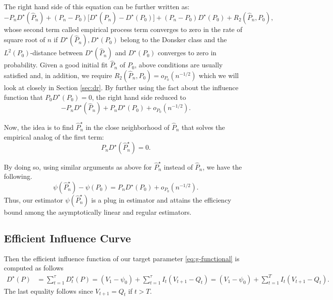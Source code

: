 \documentclass{article}
\theoremstyle{plain}
\theoremstyle{definition}
\theoremstyle{remark}
\begin{document}
The right hand side of this equation can be further written as:
\begin{equation}
    -P_nD^\star(\hat{P}_n) + (P_n-P_0)\big[D^\star(\hat{P}_n) -D^\star(P_0)\big]  + (P_n-P_0)D^\star(P_0)+ R_2(\hat{P}_n,P_0),
\end{equation}
whose second term called empirical process term converges to zero in the rate of square root of $n$ if $D^\star(\hat{P}_n), D^\star(P_0)$ belong to the Donsker class and the $L^2(P_0)$-distance between $D^\star(\hat{P}_n)$ and $D^\star(P_0)$ converges to zero in probability. Given a good initial fit $\hat{P}_n$ of $P_0$, above conditions are usually satisfied and, in addition, we require $R_2(\hat{P}_n,P_0)=o_{P_0}(n^{-1/2})$ which we will look at closely in Section \ref{sec:dr}. By further using the fact about the influence function that $P_0D^\star(P_0)=0$, the right hand side reduced to
\begin{equation}
    -P_nD^\star(\hat{P}_n) + P_nD^\star(P_0)+ o_{P_0}(n^{-1/2}).
\end{equation}

Now, the idea is to find $\hat{P}_n^\star$ in the close neighborhood of $\hat{P}_n$ that solves the empirical analog of the first term:
\begin{equation}
    \label{eq:eee}
    P_nD^\star(\hat{P}_n^\star) = 0.
\end{equation}

By doing so, using similar arguments as above for $\hat{P}_n^\star$ instead of $\hat{P}_n$, we have the following.
\begin{equation}
    \psi(\hat{P}_n^\star) - \psi(P_0) = P_nD^\star(P_0) + o_{P_0}(n^{-1/2}).
\end{equation}
Thus, our estimator $\psi(\hat{P}_n^\star)$ is a plug in estimator and attains the efficiency bound among the asymptotically linear and regular estimators.

\subsection{Efficient Influence Curve}

Then the efficient influence function of our target parameter \eqref{eq:g-functional} is computed as follows \cite{laanTargetedMinimumLoss2012}%
\begin{equation}
    \label{eq:eif}
    \begin{aligned}
        D^\star(P)&=\sum_{t=1}^{\tau}D^\star_t(P)
        = (V_1 - \psi_0) +\sum_{t=1}^{\tau}  I_{t}(V_{t+1} - Q_t)
        =(V_1 - \psi_0)+\sum_{t=1}^{T}I_{t}(V_{t+1} - Q_t).
    \end{aligned}
\end{equation}
The last equality follows since $V_{t+1}=Q_t$ if $t>T$. 
\end{document}
